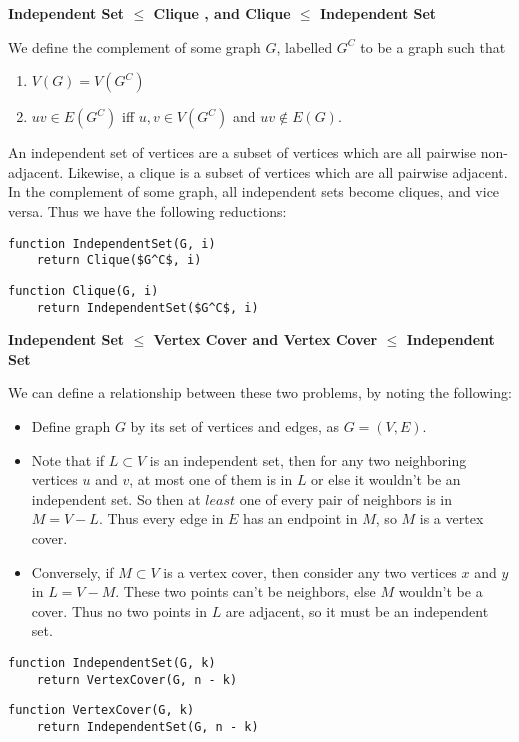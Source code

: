 \documentclass[12pt]{article}
\providecommand{\reducible}[2]{
  \textbf{#1} $\leq$ \textbf{#2}
}
\begin{document}
\begin{centering}\textbf{\reducible{Independent Set}{Clique}, and \reducible{Clique}{Independent Set}}\par\end{centering}
We define the complement of some graph $G$, labelled $G^C$ to be a graph such that
\begin{enumerate}
  \item $V(G) = V(G^C)$
  \item $uv \in E(G^C)$ iff $u,v \in V(G^C)$ and $uv \not\in E(G)$.
\end{enumerate}
An independent set of vertices are a subset of vertices which are all pairwise non-adjacent.
Likewise, a clique is a subset of vertices which are all pairwise adjacent.
In the complement of some graph, all independent sets become cliques, and vice versa.
Thus we have the following reductions:
\begin{lstlisting}
function IndependentSet(G, i)
    return Clique($G^C$, i)
\end{lstlisting}
\begin{lstlisting}
function Clique(G, i)
    return IndependentSet($G^C$, i)
\end{lstlisting}


\begin{centering}\textbf{\reducible{Independent Set}{Vertex Cover} and \reducible{Vertex Cover}{Independent Set}}\par\end{centering}
We can define a relationship between these two problems, by noting the following:
\begin{itemize}
  \item Define graph $G$ by its set of vertices and edges, as $G = (V,E)$.
  \item Note that if $L \subset V$ is an independent set, then for any two neighboring vertices $u$ and $v$, at most one of them is in $L$ or else it wouldn't be an independent set. So then at $least$ one of every pair of neighbors is in $M = V - L$. Thus every edge in $E$ has an endpoint in $M$, so $M$ is a vertex cover.
  \item Conversely, if $M \subset V$ is a vertex cover, then consider any two vertices $x$ and $y$ in $L = V - M$. These two points can't be neighbors, else $M$ wouldn't be a cover. Thus no two points in $L$ are adjacent, so it must be an independent set.
\end{itemize}
\begin{lstlisting}
function IndependentSet(G, k)
    return VertexCover(G, n - k)
\end{lstlisting}
\begin{lstlisting}
function VertexCover(G, k)
    return IndependentSet(G, n - k)
\end{lstlisting}
\end{document}
